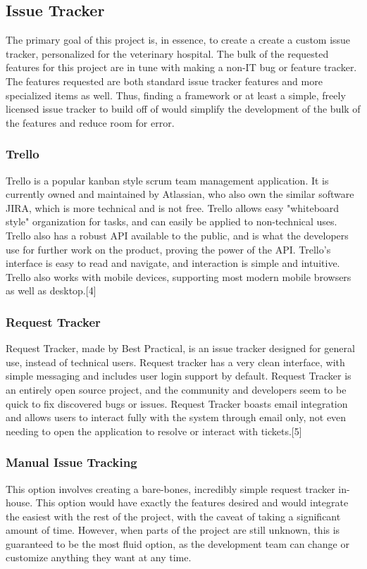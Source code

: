 \documentclass[onecolumn, draftclsnofoot,10pt, compsoc]{IEEEtran}
\begin{document}

\subsection{Issue Tracker}
The primary goal of this project is, in essence, to create a create a custom issue tracker, personalized for the veterinary hospital. The bulk of the requested features
for this project are in tune with making a non-IT bug or feature tracker. The features requested are both standard issue tracker features and more specialized items as 
well. Thus, finding a framework or at least a simple, freely licensed issue tracker to build off of would simplify the development of the bulk of the features and reduce
room for error.
\subsubsection{Trello}
Trello is a popular kanban style scrum team management application. It is currently owned and maintained by Atlassian, who also own the similar software JIRA, which is more 
technical and is not free. Trello allows easy "whiteboard style" organization for tasks, and can easily be applied to non-technical uses. Trello also has a robust API available 
to the public, and is what the developers use for further work on the product, proving the power of the API. Trello's interface is easy to read and navigate, and interaction
is simple and intuitive. Trello also works with mobile devices, supporting most modern mobile browsers as well as desktop.[4]
\subsubsection{Request Tracker}
Request Tracker, made by Best Practical, is an issue tracker designed for general use, instead of technical users. Request tracker has a very clean interface, with simple messaging
and includes user login support by default. Request Tracker is an entirely open source project, and the community and developers seem to be quick to fix discovered bugs or issues. 
Request Tracker boasts email integration and allows users to interact fully with the system through email only, not even needing to open the application to resolve or interact with
tickets.[5]
\subsubsection{Manual Issue Tracking}
This option involves creating a bare-bones, incredibly simple request tracker in-house. This option would have exactly the features desired and would integrate the easiest with the 
rest of the project, with the caveat of taking a significant amount of time. However, when parts of the project are still unknown, this is guaranteed to be the most fluid option, 
as the development team can change or customize anything they want at any time. 
\end{document}
